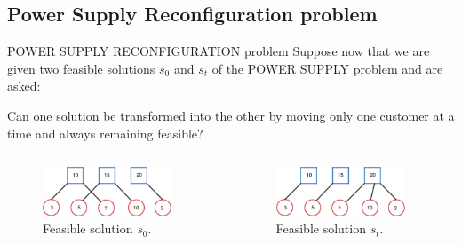 \subsection{Power Supply Reconfiguration problem}
\begin{frame}{POWER SUPPLY RECONFIGURATION problem}
Suppose now that we are given two feasible solutions $s_0$ and $s_t$ of the POWER SUPPLY problem and are asked: \hfill \break 

Can one solution be transformed into the other by moving only one customer at a time and always remaining feasible?
\pause
\begin{columns}
    \begin{column}{0.5\textwidth}
        \begin{figure}
        \centering
        \includegraphics[width=0.9\textwidth]{img/ps2.pdf}
        \caption{Feasible solution $s_0$.}
        \label{fig:circle}
        \end{figure}
    \end{column}
    \begin{column}{0.5\textwidth}
        \begin{figure}
        \centering
        \includegraphics[width=0.9\textwidth]{img/ps4.pdf}
        \caption{Feasible solution $s_t$.}
        \label{fig:circle}
        \end{figure}
    \end{column}
\end{columns}
\end{frame}

